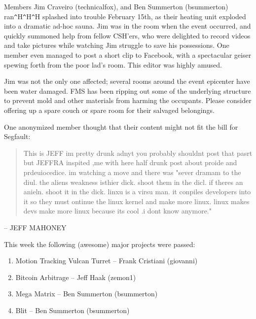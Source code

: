 \documentclass[9pt]{extarticle} %
\begin{document}
\begin{minipage}[t]{.66\linewidth} %
\vspace{-0.4cm}
\hypertarget{firstnews}{}
Members Jim Craveiro (technicalfox), and Ben Summerton (bsummerton) ran\verb|^|H\verb|^|H\verb|^|H splashed into trouble February 15th, as their heating unit exploded into a dramatic ad-hoc sauna. Jim was in the room when the event occurred, and quickly summoned help from fellow CSH'ers, who were delighted to record videos and take pictures while watching Jim struggle to save his possessions. One member even managed to post a short clip to Facebook, with a spectacular geiser spewing forth from the poor lad's room. This editor was highly amused.

Jim was not the only one affected; several rooms around the event epicenter have been water damaged. FMS has been ripping out some of the underlying structure to prevent mold and other materials from harming the occupants. Please consider offering up a spare couch or spare room for their salvaged belongings.


\hypertarget{secondnews}{} 

One anonymized member thought that their content might not fit the bill for Segfault:
\begin{quote}
This is JEFF im pretty drunk adnyt you probably shouldnt post that pasrt but JEFFRA inspited ,me with here half drunk post about proide and prdeuiocedice. im watching a move and there was "sever dramam to the diul. the aliens weakness isthier dick. shoot them in the dicl. if theres an anieln. shoot it in the dick. linxu is a virsu man. it conpiles developers into it so they must ontinue the linux kernel and make more linux. linux makes devs make more linux because its cool .i dont know anymore."
\end{quote}
-- JEFF MAHONEY

\hypertarget{thirdnews}{} 

This week the following (awesome) major projects were passed:

\begin{enumerate}
	\item{Motion Tracking Vulcan Turret -- Frank Cristiani (giovanni)}
	\item{Bitcoin Arbitrage -- Jeff Haak (zemon1)}
	\item{Mega Matrix -- Ben Summerton (bsummerton)}
	\item{Blit -- Ben Summerton (bsummerton)}
\end{enumerate}


\end{minipage}
\end{document}
